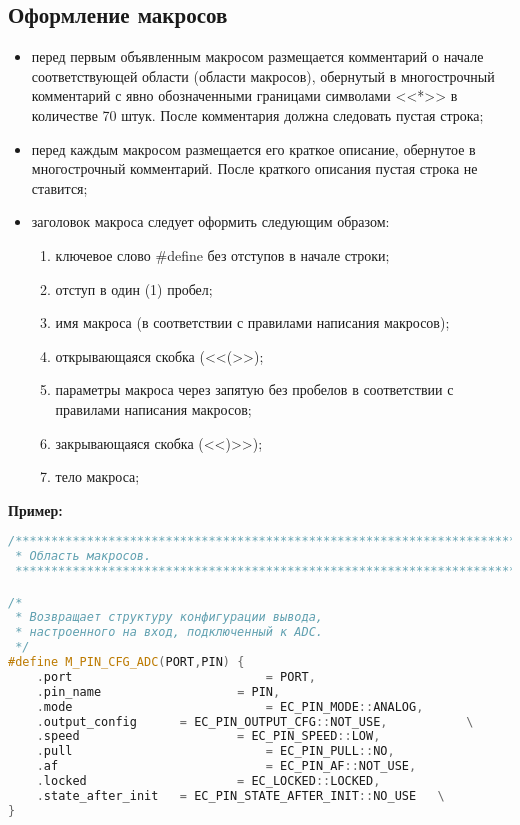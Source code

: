 \subsection{Оформление макросов}
\begin{itemize}
	\item перед первым объявленным макросом размещается комментарий о начале соответствующей области (области макросов), обернутый в многострочный комментарий с явно обозначенными границами символами <<*>> в количестве 70 штук. После комментария должна следовать  пустая строка;
	\item перед каждым макросом размещается его краткое описание, обернутое в многострочный комментарий. После краткого описания пустая строка не ставится;
	\item заголовок макроса следует оформить следующим образом:
	\begin{enumerate}
		\item ключевое слово \#define без отступов в начале строки;
		\item отступ в один (1) пробел;
		\item имя макроса (в соответствии с правилами написания макросов);
		\item открывающаяся скобка (<<(>>);
		\item параметры макроса через запятую без пробелов в соответствии с правилами написания макросов;
		\item закрывающаяся скобка (<<)>>);
		\item тело макроса;
	\end{enumerate}
\end{itemize}\textbf{Пример:}\begin{lstlisting}[language=C++, frame=tlBR, basicstyle=\fontsize{10}{10}\ttfamily]
/**********************************************************************
 * Область макросов.
 **********************************************************************/

/*
 * Возвращает структуру конфигурации вывода,
 * настроенного на вход, подключенный к ADC.
 */
#define M_PIN_CFG_ADC(PORT,PIN)	{											\
	.port							= PORT,														\
	.pin_name					= PIN,														\
	.mode							= EC_PIN_MODE::ANALOG,						\
	.output_config		= EC_PIN_OUTPUT_CFG::NOT_USE,			\
	.speed						= EC_PIN_SPEED::LOW,							\
	.pull							= EC_PIN_PULL::NO,								\
	.af								= EC_PIN_AF::NOT_USE,							\
	.locked						= EC_LOCKED::LOCKED,							\
	.state_after_init	= EC_PIN_STATE_AFTER_INIT::NO_USE	\
}\end{lstlisting}